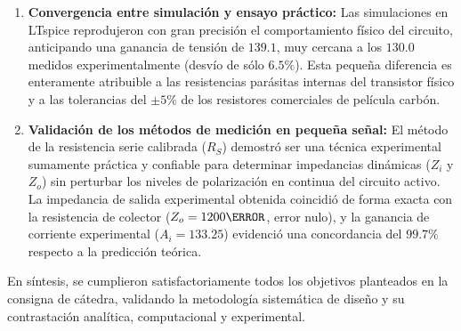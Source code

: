 \begin{enumerate}
  \item \textbf{Convergencia entre simulación y ensayo práctico:}
    Las simulaciones en LTspice reprodujeron con gran precisión el comportamiento físico del circuito, anticipando una
    ganancia de tensión de $139.1$, muy cercana a los $130.0$ medidos experimentalmente (desvío de sólo $6.5\%$). Esta
    pequeña diferencia es enteramente atribuible a las resistencias parásitas internas del transistor físico y a las
    tolerancias del $\pm 5\%$ de los resistores comerciales de película carbón.

  \item \textbf{Validación de los métodos de medición en pequeña señal:}
    El método de la resistencia serie calibrada ($R_S$) demostró ser una técnica experimental sumamente práctica y
    confiable para determinar impedancias dinámicas ($Z_i$ y $Z_o$) sin perturbar los niveles de polarización en
    continua del circuito activo. La impedancia de salida experimental obtenida coincidió de forma exacta con la
    resistencia de colector ($Z_o = 1200\ohm$, error nulo), y la ganancia de corriente experimental ($A_i = 133.25$)
    evidenció una concordancia del $99.7\%$ respecto a la predicción teórica.
\end{enumerate}

En síntesis, se cumplieron satisfactoriamente todos los objetivos planteados en la consigna de cátedra, validando la
metodología sistemática de diseño y su contrastación analítica, computacional y experimental.
